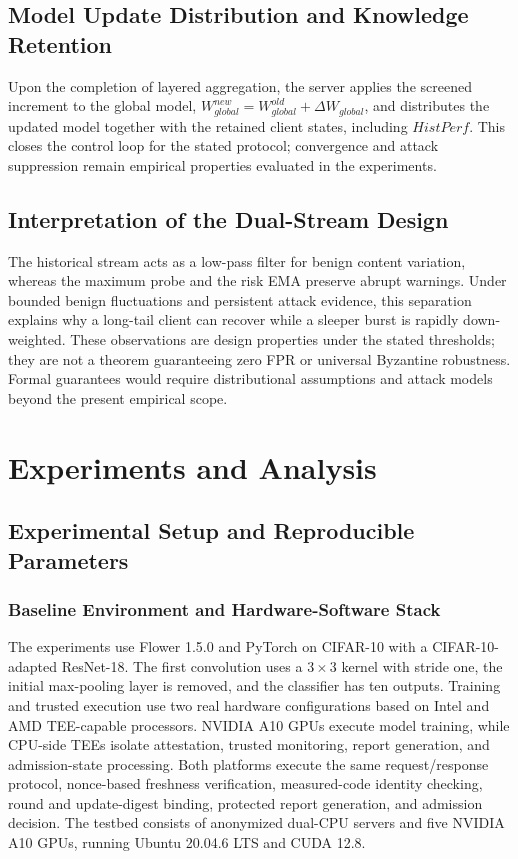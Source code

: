 \documentclass[final,5p,times,twocolumn]{elsarticle/elsarticle}
\begin{document}
\subsection{Model Update Distribution and Knowledge Retention}
Upon the completion of layered aggregation, the server applies the screened increment to the global model, $W_{global}^{new}=W_{global}^{old}+\Delta W_{global}$, and distributes the updated model together with the retained client states, including $HistPerf$. This closes the control loop for the stated protocol; convergence and attack suppression remain empirical properties evaluated in the experiments.

\subsection{Interpretation of the Dual-Stream Design}
The historical stream acts as a low-pass filter for benign content variation,
whereas the maximum probe and the risk EMA preserve abrupt warnings. Under
bounded benign fluctuations and persistent attack evidence, this separation
explains why a long-tail client can recover while a sleeper burst is rapidly
down-weighted. These observations are design properties under the stated
thresholds; they are not a theorem guaranteeing zero FPR or universal Byzantine
robustness. Formal guarantees would require distributional assumptions and
attack models beyond the present empirical scope.

\section{Experiments and Analysis}
\label{sec:experiments}
\subsection{Experimental Setup and Reproducible Parameters}

\subsubsection{Baseline Environment and Hardware-Software Stack}
The experiments use Flower 1.5.0 and PyTorch on CIFAR-10 with a
CIFAR-10-adapted ResNet-18. The first convolution uses a $3\times3$ kernel
with stride one, the initial max-pooling layer is removed, and the classifier
has ten outputs. Training and trusted execution use two real hardware
configurations based on Intel and AMD TEE-capable processors. NVIDIA A10 GPUs
execute model training, while CPU-side TEEs isolate attestation, trusted
monitoring, report generation, and admission-state processing. Both platforms
execute the same request/response protocol, nonce-based freshness verification,
measured-code identity checking, round and update-digest binding, protected
report generation, and admission decision. The testbed consists of anonymized
dual-CPU servers and five NVIDIA A10 GPUs, running Ubuntu 20.04.6 LTS and CUDA
12.8.
\end{document}
